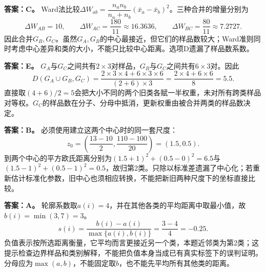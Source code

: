 \textbf{答案：C。} Ward法比较$\Delta W_{ab}=\dfrac{n_an_b}{n_a+n_b}(\bar x_a-\bar x_b)^2$。三种合并的增量分别为\[\Delta W_{AB}=10,\qquad \Delta W_{AC}=\frac{180}{11}\approx16.3636,\qquad\Delta W_{BC}=\frac{80}{11}\approx7.2727.\]因此合并$G_B,G_C$。虽然$G_A,G_B$的中心最接近，但它们的样品数较大；Ward准则同时考虑中心差异和类的大小，不能只比较中心距离。选项D遗漏了样品数系数。
\par\nobreak\smallskip{}

\textbf{答案：E。} $G_A$与$G_C$之间共有$2\times3$对样品，$G_B$与$G_C$之间共有$6\times3$对。因此\[D(G_A\cup G_B,G_C)=\frac{2\times3\times4+6\times3\times6}{(2+6)\times3}=\frac{2\times4+6\times6}{8}=5.5.\]直接取$(4+6)/2=5$会把大小不同的两个旧类各赋一半权重，未对所有跨类样品对等权。$G_C$的样品数在分子、分母中抵消，更新权重由被合并两类的样品数决定。
\par\nobreak\smallskip{}

\textbf{答案：B。} 必须使用建立这两个中心时的同一套尺度：\[z_0=\left(\frac{13-10}{2},\frac{110-100}{20}\right)=(1.5,0.5).\]到两个中心的平方欧氏距离分别为$(1.5+1)^2+(0.5-0)^2=6.5$与$(1.5-1)^2+(0.5-1)^2=0.5$，故归第2类。只除以标准差遗漏了中心化；若重新估计标准化参数，旧中心也须相应转换，不能把新旧两种尺度下的坐标直接比较。
\par\nobreak\smallskip{}

\textbf{答案：A。} 轮廓系数取$a(i)=4$，并在其他各类的平均距离中取最小值，故$b(i)=\min(3,7)=3$。\[s(i)=\frac{b(i)-a(i)}{\max\{a(i),b(i)\}}=\frac{3-4}{4}=-0.25.\]负值表示按所选距离衡量，它平均而言更接近另一个类，本题近邻类为第2类；这提示检查边界样品和类别解释，不能把负值本身当成已有真实标签下的误判证明。分母应为$\max(a,b)$，不能固定取$b$，也不能先平均所有其他类的距离。
\par\nobreak\smallskip{}

